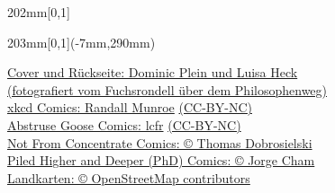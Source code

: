{\begin{textblock*}{202mm}[0,1]
\begin{flushleft}
        \end{flushleft}
    \end{textblock*}

    \begin{textblock*}{203mm}[0,1](-7mm,290mm)
        \begin{flushright}
            \footnotesize
            \href{https://mathphys.info/}{Cover und Rückseite: Dominic Plein und Luisa Heck\\(fotografiert vom Fuchsrondell über dem Philosophenweg)}\\ %
            \href{https://xkcd.com/}{xkcd Comics: Randall Munroe} \href{https://creativecommons.org/licenses/by-nc/2.5/}{(CC-BY-NC)}\\
            \href{https://abstrusegoose.com/}{Abstruse Goose Comics: lcfr} \href{https://creativecommons.org/licenses/by-nc/3.0/us/}{(CC-BY-NC)}\\
            \href{https://nfccomic.com}{Not From Concentrate Comics: \copyright{} Thomas Dobrosielski}\\
            \href{https://www.phdcomics.com/}{Piled Higher and Deeper (PhD) Comics: \copyright{} Jorge Cham}\\
            \href{https://www.openstreetmap.org/}{Landkarten: \copyright{} OpenStreetMap contributors}
        \end{flushright}
    \end{textblock*}
}

\graphicspath{{./bilder/}{./}}



